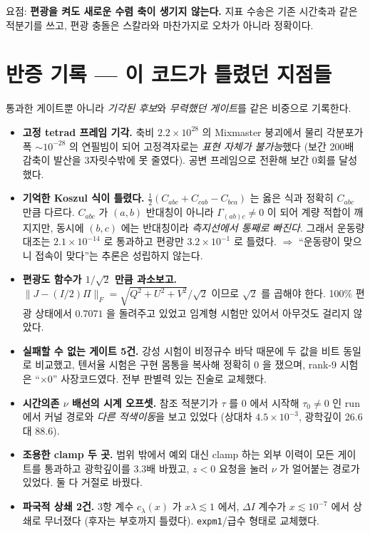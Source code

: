 \documentclass[11pt,a4paper]{article}
\begin{document}
\noindent 요점: \textbf{편광을 켜도 새로운 수렴 축이 생기지 않는다.} 지표 수송은
기존 시간축과 같은 적분기를 쓰고, 편광 충돌은 스칼라와 마찬가지로 오차가 아니라
정확이다.

\section{반증 기록 --- 이 코드가 틀렸던 지점들}

통과한 게이트뿐 아니라 \emph{기각된 후보}와 \emph{무력했던 게이트}를 같은
비중으로 기록한다.

\begin{itemize}\itemsep2pt
\item \textbf{고정 tetrad 프레임 기각.} 축비 $2.2\times10^{28}$ 의 Mixmaster
붕괴에서 물리 각분포가 폭 $\sim10^{-28}$ 의 연필빔이 되어 고정격자로는
\emph{표현 자체가 불가능}했다 (보간 200배 감축이 발산을 3자릿수밖에 못 줄였다).
공변 프레임으로 전환해 보간 0회를 달성했다.

\item \textbf{기억한 Koszul 식이 틀렸다.} $\tfrac12(C_{abc}+C_{cab}-C_{bca})$ 는
옳은 식과 정확히 $C_{abc}$ 만큼 다르다. $C_{abc}$ 가 $(a,b)$ 반대칭이 아니라
$\Gamma_{(ab)c}\neq0$ 이 되어 계량 적합이 깨지지만, 동시에 $(b,c)$ 에는 반대칭이라
\emph{측지선에서 통째로 빠진다}. 그래서 운동량 대조는 $2.1\times10^{-14}$ 로
통과하고 편광만 $3.2\times10^{-1}$ 로 틀렸다. $\Rightarrow$ ``운동량이 맞으니
접속이 맞다''는 추론은 성립하지 않는다.

\item \textbf{편광도 함수가 $1/\sqrt2$ 만큼 과소보고.}
$\|J-(I/2)\Pi\|_F=\sqrt{Q^2+U^2+V^2}/\sqrt2$ 이므로 $\sqrt2$ 를 곱해야 한다.
100\% 편광 상태에서 $0.7071$ 을 돌려주고 있었고 임계형 시험만 있어서 아무것도
걸리지 않았다.

\item \textbf{실패할 수 없는 게이트 5건.} 강성 시험이 비정규수 바닥 때문에 두 값을
비트 동일로 비교했고, 텐서율 시험은 구현 몸통을 복사해 정확히 0 을 쟀으며,
rank-9 시험은 ``$\times0$'' 사장코드였다. 전부 판별력 있는 진술로 교체했다.

\item \textbf{시간의존 $\nu$ 배선의 시계 오프셋.} 참조 적분기가 $\tau$ 를 0 에서
시작해 $\tau_0\neq0$ 인 run 에서 커널 경로와 \emph{다른 적색이동}을 보고 있었다
(상대차 $4.5\times10^{-3}$, 광학깊이 26.6 대 88.6).

\item \textbf{조용한 clamp 두 곳.} 범위 밖에서 예외 대신 clamp 하는 외부 이력이
모든 게이트를 통과하고 광학깊이를 3.3배 바꿨고, $z<0$ 요청을 눌러 $\nu$ 가
얼어붙는 경로가 있었다. 둘 다 거절로 바꿨다.

\item \textbf{파국적 상쇄 2건.} 3항 계수 $c_\lambda(x)$ 가 $x\lambda\lesssim1$ 에서,
$\Delta I$ 계수가 $x\lesssim10^{-7}$ 에서 상쇄로 무너졌다 (후자는 부호까지 틀렸다).
\texttt{expm1}/급수 형태로 교체했다.
\end{itemize}
\end{document}

